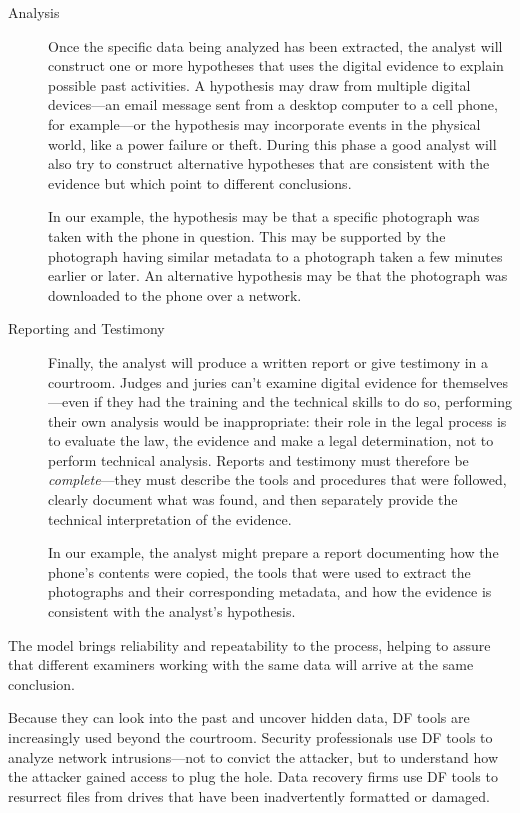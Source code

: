 \begin{description}
\item[Analysis] Once the specific data being analyzed has been
  extracted, the analyst will construct one or more hypotheses that
  uses the digital evidence to explain possible past activities. A
  hypothesis may draw from multiple digital devices---an email message
  sent from a desktop computer to a cell phone, for example---or the
  hypothesis may incorporate events in the physical world, like a
  power failure or theft. During this phase a good analyst will also
  try to construct alternative hypotheses that are consistent with the
  evidence but which point to different conclusions. 

  In our example, the hypothesis may be that a specific photograph was
  taken with the phone in question. This may be supported by the
  photograph having similar metadata to a photograph taken a few
  minutes earlier or later. An alternative hypothesis may be that the
  photograph was downloaded to the phone over a network.

\item[Reporting and Testimony] Finally, the analyst will
  produce a written report or give testimony in a courtroom.
  Judges and juries can't examine digital evidence for
  themselves---even if they had the training and the technical skills
  to do so, performing their own analysis would be inappropriate:
  their role in the legal process is to evaluate the law, the evidence
  and make a legal determination, not to perform technical
  analysis. Reports and testimony must therefore be 
  \emph{complete}---they must describe the tools and procedures
  that were followed, clearly document what was found, and then
  separately provide the technical interpretation of the
  evidence. 

  In our example, the analyst might prepare a report documenting how
  the phone's contents were copied, the tools that were used to
  extract the photographs and their corresponding metadata, and how
  the evidence is consistent with the analyst's hypothesis. 

\end{description}

The model brings reliability and repeatability to the process, helping
to assure that different examiners working with the same data will
arrive at the same conclusion. 

Because they can look into the past and uncover hidden data, DF tools
are increasingly used beyond the courtroom. Security professionals use
DF tools to analyze network intrusions---not to convict the attacker,
but to understand how the attacker gained access to plug the
hole. Data recovery firms use DF tools to resurrect files from drives
that have been inadvertently formatted or damaged. 

